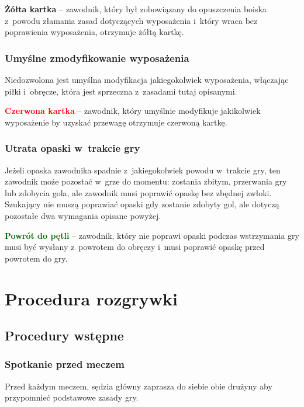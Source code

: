 \documentclass[12pt]{article}
\newcommand\redcard[1]{\bgroup\textcolor{red}{\textbf{#1}}}
\newcommand\yellowcard[1]{\bgroup\textcolor{darkyellow}{\textbf{#1}}}
\newcommand\other[1]{\bgroup\textcolor{darkgreen}{\textbf{#1}}}
\begin{document}
\yellowcard{Żółta kartka} -- zawodnik, który był zobowiązany do opuszczenia
boiska z~powodu złamania zasad dotyczących wyposażenia i~który wraca bez
poprawienia wyposażenia, otrzymuje żółtą kartkę.

\subsubsection{Umyślne zmodyfikowanie wyposażenia}
Niedozwolona jest
umyślna modyfikacja jakiegokolwiek wyposażenia, włączając piłki i~obręcze, która jest sprzeczna z~zasadami tutaj opisanymi.

\redcard{Czerwona kartka} -- zawodnik, który umyślnie modyfikuje
jakikolwiek wyposażenie by uzyskać przewagę otrzymuje czerwoną kartkę.

\subsubsection{Utrata opaski w~trakcie gry}
Jeżeli opaska zawodnika
spadnie z~jakiegokolwiek powodu w~trakcie gry, ten zawodnik może
pozostać w~grze do momentu: zostania zbitym, przerwania gry lub zdobycia
gola, ale zawodnik musi poprawić opaskę bez zbędnej zwłoki. Szukający
nie muszą poprawiać opaski gdy zostanie zdobyty gol, ale dotyczą
pozostałe dwa wymagania opisane powyżej.

\other{Powrót do pętli} -- zawodnik, który nie poprawi opaski podczas
wstrzymania gry musi być wysłany z~powrotem do obręczy i~musi poprawić
opaskę przed powrotem do gry.

\pagebreak
\section{Procedura rozgrywki}

\subsection{Procedury wstępne}

\subsubsection{Spotkanie przed meczem}
Przed każdym meczem, sędzia
główny zaprasza do siebie obie drużyny aby przypomnieć podstawowe zasady
gry.
\end{document}
